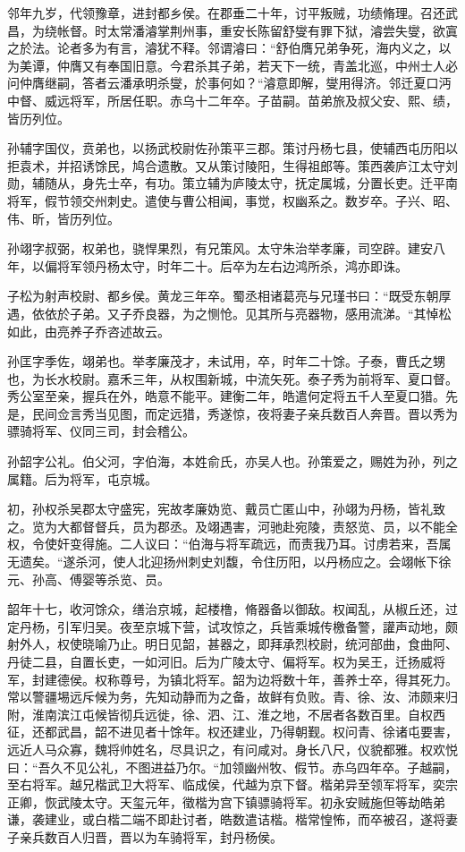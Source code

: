 \documentclass[12pt,UTF8]{ctexbook}
\begin{document}
邻年九岁，代领豫章，进封都乡侯。在郡垂二十年，讨平叛贼，功绩脩理。召还武昌，为绕帐督。时太常潘濬掌荆州事，重安长陈留舒燮有罪下狱，濬尝失燮，欲寘之於法。论者多为有言，濬犹不释。邻谓濬曰：“舒伯膺兄弟争死，海内义之，以为美谭，仲膺又有奉国旧意。今君杀其子弟，若天下一统，青盖北巡，中州士人必问仲膺继嗣，答者云潘承明杀燮，於事何如？“濬意即解，燮用得济。邻迁夏口沔中督、威远将军，所居任职。赤乌十二年卒。子苗嗣。苗弟旅及叔父安、熙、绩，皆历列位。

孙辅字国仪，贲弟也，以扬武校尉佐孙策平三郡。策讨丹杨七县，使辅西屯历阳以拒袁术，并招诱馀民，鸠合遗散。又从策讨陵阳，生得祖郎等。策西袭庐江太守刘勋，辅随从，身先士卒，有功。策立辅为庐陵太守，抚定属城，分置长吏。迁平南将军，假节领交州刺史。遣使与曹公相闻，事觉，权幽系之。数岁卒。子兴、昭、伟、昕，皆历列位。

孙翊字叔弼，权弟也，骁悍果烈，有兄策风。太守朱治举孝廉，司空辟。建安八年，以偏将军领丹杨太守，时年二十。后卒为左右边鸿所杀，鸿亦即诛。

子松为射声校尉、都乡侯。黄龙三年卒。蜀丞相诸葛亮与兄瑾书曰：“既受东朝厚遇，依依於子弟。又子乔良器，为之恻怆。见其所与亮器物，感用流涕。“其悼松如此，由亮养子乔咨述故云。

孙匡字季佐，翊弟也。举孝廉茂才，未试用，卒，时年二十馀。子泰，曹氏之甥也，为长水校尉。嘉禾三年，从权围新城，中流矢死。泰子秀为前将军、夏口督。秀公室至亲，握兵在外，皓意不能平。建衡二年，皓遣何定将五千人至夏口猎。先是，民间佥言秀当见图，而定远猎，秀遂惊，夜将妻子亲兵数百人奔晋。晋以秀为骠骑将军、仪同三司，封会稽公。

孙韶字公礼。伯父河，字伯海，本姓俞氏，亦吴人也。孙策爱之，赐姓为孙，列之属籍。后为将军，屯京城。

初，孙权杀吴郡太守盛宪，宪故孝廉妫览、戴员亡匿山中，孙翊为丹杨，皆礼致之。览为大都督督兵，员为郡丞。及翊遇害，河驰赴宛陵，责怒览、员，以不能全权，令使奸变得施。二人议曰：“伯海与将军疏远，而责我乃耳。讨虏若来，吾属无遗矣。“遂杀河，使人北迎扬州刺史刘馥，令住历阳，以丹杨应之。会翊帐下徐元、孙高、傅婴等杀览、员。

韶年十七，收河馀众，缮治京城，起楼橹，脩器备以御敌。权闻乱，从椒丘还，过定丹杨，引军归吴。夜至京城下营，试攻惊之，兵皆乘城传檄备警，讙声动地，颇射外人，权使晓喻乃止。明日见韶，甚器之，即拜承烈校尉，统河部曲，食曲阿、丹徒二县，自置长吏，一如河旧。后为广陵太守、偏将军。权为吴王，迁扬威将军，封建德侯。权称尊号，为镇北将军。韶为边将数十年，善养士卒，得其死力。常以警疆埸远斥候为务，先知动静而为之备，故鲜有负败。青、徐、汝、沛颇来归附，淮南滨江屯候皆彻兵远徙，徐、泗、江、淮之地，不居者各数百里。自权西征，还都武昌，韶不进见者十馀年。权还建业，乃得朝觐。权问青、徐诸屯要害，远近人马众寡，魏将帅姓名，尽具识之，有问咸对。身长八尺，仪貌都雅。权欢悦曰：“吾久不见公礼，不图进益乃尔。“加领幽州牧、假节。赤乌四年卒。子越嗣，至右将军。越兄楷武卫大将军、临成侯，代越为京下督。楷弟异至领军将军，奕宗正卿，恢武陵太守。天玺元年，徵楷为宫下镇骠骑将军。初永安贼施但等劫皓弟谦，袭建业，或白楷二端不即赴讨者，皓数遣诘楷。楷常惶怖，而卒被召，遂将妻子亲兵数百人归晋，晋以为车骑将军，封丹杨侯。
\end{document}

